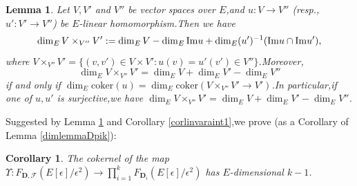 \documentclass[SecEq,CM,GP]{degruyter-crelle} %
\theoremstyle{plain}
\newtheorem{cor}[thm]{Corollary}
\newtheorem{lem}[thm]{Lemma}
\newcommand{\Dpik}{{\mathbf{D}}}
\newcommand{\im}{{\rm Im}}
\newcommand{\cF}{\mathcal F}
\begin{document}
\begin{lem}\label{fibredim}Let $V,V'$ and $V''$ be vector spaces over $E$,\;and $u:V\rightarrow V''$ (resp.,\;$u':V'\rightarrow V''$) be $E$-linear homomorphism.\;Then we have 
\[\dim_E V\times_{V''}V':=\dim_EV-\dim_E\im u+\dim_E(u')^{-1}(\im u\cap\im u'),\]
where $V\times_{V''}V'=\{(v,v')\in V\times V':u(v)=u'(v')\in V''\}$.\;Moreover,\;\[\dim_E V\times_{V''}V'=\dim_EV+\dim_EV'-\dim_EV''\] if and only if $\dim_E\mathrm{coker}(u)=\dim_E\mathrm{coker}(V\times_{V''}V'\rightarrow V')$.\;In particular,\;if one of $u,u'$ is surjective,\;we have $\dim_E V\times_{V''}V'=\dim_EV+\dim_EV'-\dim_EV''$.\;
\end{lem}

Suggested by Lemma  \ref{fibredim} and Corollary \ref{corlinvaraint1},\;we prove (as  a Corollary of Lemma \ref{dimlemmaDpik}):
\begin{cor}\label{corlinvaraint2}The cokernel of the map $\Upsilon:F_{\Dpik,\cF}(E[\epsilon]/\epsilon^2)\longrightarrow \prod_{i=1}^kF_{\Dpik_i}(E[\epsilon]/\epsilon^2)$ has $E$-dimensional $k-1$.\;
\end{cor}
\end{document}
